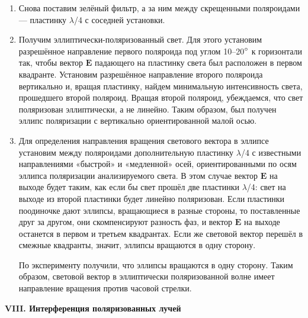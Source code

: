 \documentclass[12pt,a4paper]{article}
\begin{document}
\begin{enumerate}
	
		\item Снова поставим зелёный фильтр, а за ним между скрещенными поляроидами — пластинку $\lambda$/4 с соседней установки.
		
		\item Получим эллиптически-поляризованный свет. Для этого установим разрешённое направление первого поляроида под углом 10–20$\degree$ к горизонтали так, чтобы вектор $\boldsymbol{E}$ падающего на пластинку света был расположен в первом квадранте. Установим разрешённое направление второго поляроида вертикально и, вращая пластинку, найдем минимальную интенсивность света, прошедшего второй поляроид. Вращая второй поляроид, убеждаемся, что свет поляризован эллиптически, а не линейно. Таким образом, был получен эллипс поляризации с вертикально ориентированной малой осью.
		
		\item Для определения направления вращения светового вектора в эллипсе установим между поляроидами дополнительную пластинку $\lambda$/4 с известными направлениями «быстрой» и «медленной» осей, ориентированными по осям эллипса поляризации анализируемого света. В этом случае вектор $\boldsymbol{E}$ на выходе будет таким, как если бы свет прошёл две пластинки $\lambda$/4: свет на выходе из второй пластинки будет линейно поляризован. Если пластинки поодиночке дают эллипсы, вращающиеся в разные стороны, то поставленные друг за другом, они скомпенсируют разность фаз, и вектор $\boldsymbol{E}$ на выходе останется в первом и третьем квадрантах. Если же световой вектор перешёл в смежные квадранты, значит, эллипсы вращаются в одну сторону.
		
		По эксперименту получили, что эллипсы вращаются в одну сторону. Таким образом, световой вектор в эллиптически поляризованной волне имеет направление вращения против часовой стрелки.
	
	\end{enumerate}


	\begin{center}
		\textbf{VIII. Интерференция поляризованных лучей}
	\end{center}
\end{document}
